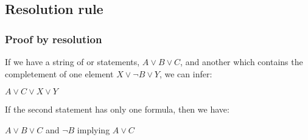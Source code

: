 \subsection{Resolution rule}

\subsubsection{Proof by resolution}

If we have a string of or statements, \(A\lor B\lor C\), and another which contains the completement of one element \(X\lor ¬B\lor Y\), we can infer:

\(A\lor C\lor X\lor Y\)

If the second statement has only one formula, then we have:

\(A\lor B\lor C\) and \(¬B\) implying \(A\lor C\)


